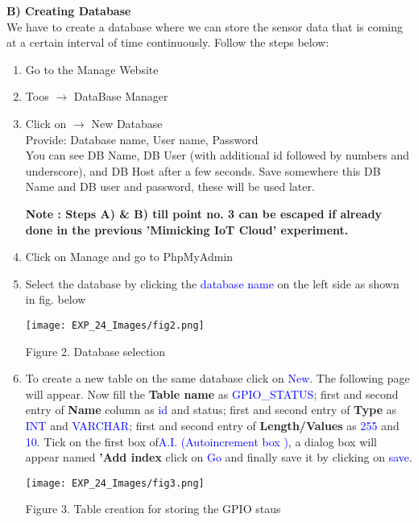 \documentclass[12pt,a4paper]{article}
\begin{document}
\begin{justify}
\noindent \textbf{B) Creating Database}\\[3pt]
We have to create a database where we can store the sensor data that is coming at a certain interval of time continuously. Follow the steps below:
\vspace{-3mm}
\begin{enumerate}
\setlength\itemsep{-0.3em}
\item Go to the Manage Website
\item Toos $ \rightarrow $  DataBase Manager
\item Click on $ \rightarrow $ New Database\\
Provide: Database name, User name, Password\\
You can see DB Name, DB User (with additional id followed by numbers and underscore), and DB Host after a few seconds. Save somewhere this DB Name and DB user and password, these will be used later.

\textbf{Note : Steps A) \& B) till point no. 3 can be escaped if already done in the previous 'Mimicking IoT Cloud' experiment.}


\item Click on Manage and go to PhpMyAdmin
\item Select the database by clicking  the \textcolor{blue}{database name} on the left side as shown in fig. below

\begin{center} 
\texttt{[image: EXP\_24\_Images/fig2.png]}
\end{center}
\begin{center} {Figure 2. Database selection}\end{center}

\item  To create a new table on the same database click on \textcolor{blue}{New}. The following page will appear.
Now fill the \textbf{Table name} as \textcolor{blue}{GPIO\_STATUS}; first and second entry of \textbf{Name} column as \textcolor{blue}{id} and status; first and second entry of \textbf{Type} as \textcolor{blue}{INT} and \textcolor{blue}{VARCHAR};  first and second entry of\textbf{ Length/Values }as \textcolor{blue}{255} and \textcolor{blue}{10}. Tick on the first box of\textcolor{blue}{A.I. (Autoincrement box )}, a dialog box will appear named \textbf{'Add index} click on \textcolor{blue}{Go} and finally save it by clicking on \textcolor{blue}{save}.

\begin{center} 
\texttt{[image: EXP\_24\_Images/fig3.png]}
\end{center}
\begin{center} {Figure 3. Table creation for storing the GPIO staus}\end{center}



\end{enumerate}
\end{justify}
\end{document}
